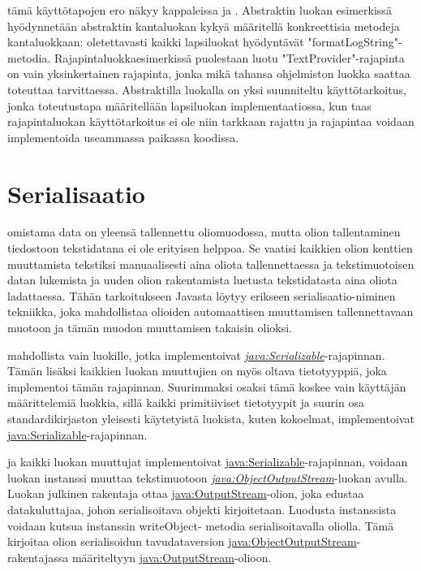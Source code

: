 \documentclass[a4paper,justified,notoc]{tufte-book}
\newcommand{\java}[1]{\underline{\gls{java:#1}}}
\newcommand{\newjava}[1]{\textit{\java{#1}}}
\begin{document}
\begin{fullwidth}
 tämä käyttötapojen ero näkyy kappaleissa 
ja . Abstraktin luokan esimerkissä hyödynnetään abstraktin kantaluokan kykyä
määritellä konkreettisia metodeja kantaluokkaan: oletettavasti kaikki lapsiluokat hyödyntävät
"formatLogString"-metodia. Rajapintaluokkaesimerkissä puolestaan luotu "TextProvider"-rajapinta
on vain yksinkertainen rajapinta, jonka mikä tahansa ohjelmiston luokka saattaa toteuttaa
tarvittaessa. Abstraktilla luokalla on yksi suunniteltu käyttötarkoitus, jonka toteutustapa
määritellään lapsiluokan implementaatiossa, kun taas rajapintaluokan käyttötarkoitus ei ole niin
tarkkaan rajattu ja rajapintaa voidaan implementoida useammassa paikassa koodissa.


\section{Serialisaatio}
\label{serialisaatio}

 omistama data on yleensä tallennettu oliomuodossa, mutta olion
tallentaminen tiedostoon tekstidatana ei ole erityisen helppoa. Se vaatisi kaikkien olion kenttien
muuttamista tekstiksi manuaalisesti aina oliota tallennettaessa ja tekstimuotoisen datan lukemista
ja uuden olion rakentamista luetusta tekstidatasta aina oliota ladattaessa. Tähän tarkoitukseen
Javasta löytyy erikseen \gls{serialisaatio}-niminen tekniikka, joka mahdollistaa olioiden
automaattisen muuttamisen tallennettavaan muotoon ja tämän muodon muuttamisen takaisin olioksi.

 mahdollista vain luokille, jotka implementoivat
\newjava{Serializable}-rajapinnan. Tämän lisäksi kaikkien luokan muuttujien on myös oltava
tietotyyppiä, joka implementoi tämän rajapinnan. Suurimmaksi osaksi tämä koskee vain käyttäjän
määrittelemiä luokkia, sillä kaikki primitiiviset tietotyypit ja suurin osa standardikirjaston
yleisesti käytetyistä luokista, kuten kokoelmat, implementoivat \java{Serializable}-rajapinnan.

 ja kaikki luokan muuttujat implementoivat \java{Serializable}-rajapinnan,
voidaan luokan instanssi muuttaa tekstimuotoon \newjava{ObjectOutputStream}-luokan avulla.
Luokan julkinen rakentaja ottaa \java{OutputStream}-olion, joka edustaa datakuluttajaa, johon
serialisoitava objekti kirjoitetaan. Luodusta instanssista voidaan kutsua instanssin writeObject-
metodia serialisoitavalla oliolla. Tämä kirjoitaa olion serialisoidun tavudataversion
\java{ObjectOutputStream}-rakentajassa määriteltyyn \java{OutputStream}-olioon.


\end{fullwidth}
\end{document}
